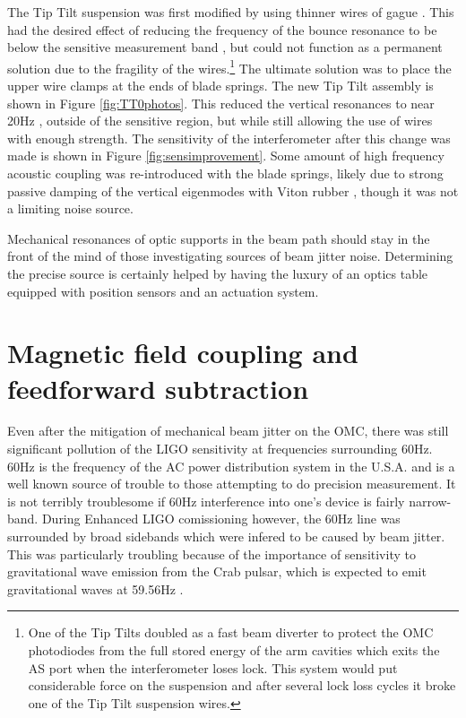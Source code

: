 The Tip Tilt suspension was first modified by using thinner wires of gague . %
This had the desired effect of reducing the frequency of the bounce resonance to be below the sensitive measurement band \cite{smallwirecoupling}, but could not function as a permanent solution due to the fragility of the wires.\footnote{One of the Tip Tilts doubled as a fast beam diverter to protect the OMC photodiodes from the full stored energy of the arm cavities which exits the AS port when the interferometer loses lock. %
This system would put considerable force on the suspension and after several lock loss cycles it broke one of the Tip Tilt suspension wires.} The ultimate solution was to place the upper wire clamps at the ends of blade springs. %
The new Tip Tilt assembly is shown in Figure \ref{fig:TT0photos}. %
This reduced the vertical resonances to near 20Hz \cite{bladebounce,bladebounceLHO}, outside of the sensitive region, but while still allowing the use of wires with enough strength. %
The sensitivity of the interferometer after this change was made is shown in Figure \ref{fig:sensimprovement}. %
Some amount of high frequency acoustic coupling was re-introduced with the blade springs, likely due to strong passive damping of the vertical eigenmodes with Viton rubber \cite{G1100330}, though it was not a limiting noise source.

Mechanical resonances of optic supports in the beam path should stay in the front of the mind of those investigating sources of beam jitter noise. %
Determining the precise source is certainly helped by having the luxury of an optics table equipped with position sensors and an actuation system.
\section{Magnetic field coupling and feedforward subtraction}
Even after the mitigation of mechanical beam jitter on the OMC, there was still significant pollution of the LIGO sensitivity at frequencies surrounding 60Hz. %
60Hz is the frequency of the AC power distribution system in the U.S.A. %
and is a well known source of trouble to those attempting to do precision measurement. %
It is not terribly troublesome if 60Hz interference into one's device is fairly narrow-band. %
During Enhanced LIGO comissioning however, the 60Hz line was surrounded by broad sidebands which were infered to be caused by beam jitter. %
This was particularly troubling because of the importance of sensitivity to gravitational wave emission from the Crab pulsar, which is expected to emit gravitational waves at 59.56Hz \cite{Crab}.

